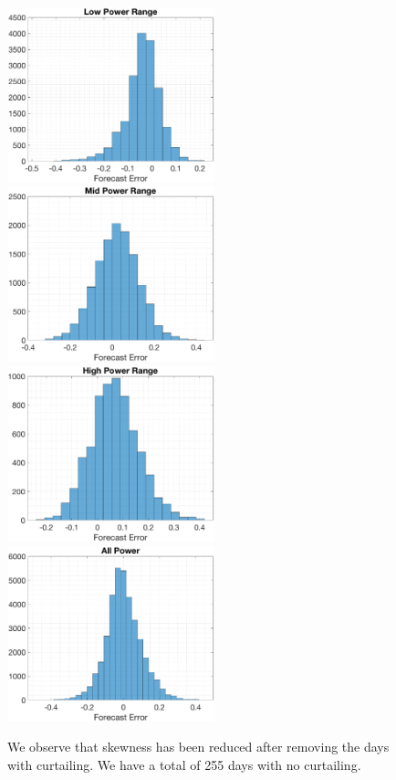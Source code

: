 \documentclass[11pt]{article}
\begin{document}
\begin{figure}
  \includegraphics[width=60mm,scale=1]{plots/LP.eps}
  \includegraphics[width=60mm,scale=1]{plots/MP.eps}\\
   \includegraphics[width=60mm,scale=1]{plots/HP.eps}
  \includegraphics[width=60mm,scale=1]{plots/AP.eps}
  \caption{We observe that skewness has been reduced after removing the days with curtailing. We have a total of 255 days with no curtailing.}
  \label{fig:data_after_clean}
\end{figure}
\end{document}
